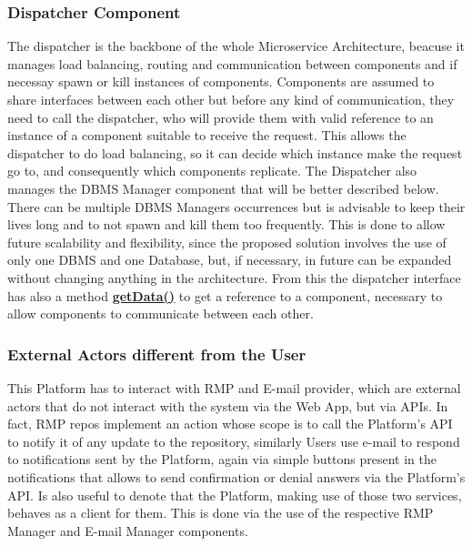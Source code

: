 \subsubsection{Dispatcher Component} \label{parr:dispatcher}
The dispatcher is the backbone of the whole Microservice Architecture, beacuse it manages load balancing, routing and communication between components and if necessay spawn or kill instances of components. 
Components are assumed to share interfaces between each other but before any kind of communication, they need to call the dispatcher, who will provide them with valid reference to an instance of a component suitable to receive the request.
This allows the dispatcher to do load balancing, so it can decide which instance make the request go to, and consequently which components replicate.
The Dispatcher also manages the DBMS Manager component that will be better described below. There can be multiple DBMS Managers occurrences but is advisable to keep their lives long and to not spawn and kill them too frequently. 
This is done to allow future scalability and flexibility, since the proposed solution involves the use of only one DBMS and one Database, but, if necessary, in future can be expanded without changing anything in the architecture.
From this the dispatcher interface has also a method \hyperref[meth:dispGetData]{\textbf{getData()}} to get a reference to a component, necessary to allow components to communicate between each other.\\

\subsubsection{External Actors different from the User} 
This Platform has to interact with RMP and E-mail provider, which are external actors that do not interact with the system via the Web App, but via APIs.
In fact, RMP repos implement an action whose scope is to call the Platform's API to notify it of any update to the repository, similarly Users use e-mail to respond to notifications sent by the Platform, again via simple buttons present in the notifications that allows to send confirmation or denial answers via the Platform's API.
Is also useful to denote that the Platform, making use of those two services, behaves as a client for them. This is done via the use of the respective RMP Manager and E-mail Manager components.

